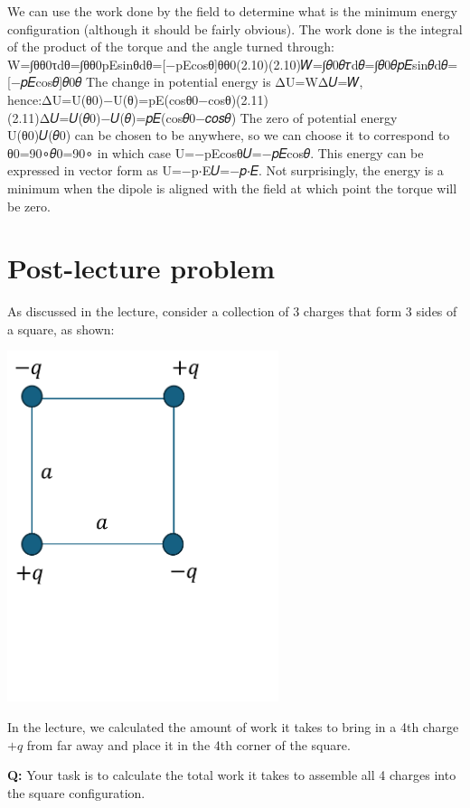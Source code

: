 \documentclass[
  letterpaper,
  DIV=11,
  numbers=noendperiod]{scrreprt}
\begin{document}
We can use the work done by the field to determine what is the minimum
energy configuration (although it should be fairly obvious). The work
done is the integral of the product of the torque and the angle turned
through:
W=∫θθ0\textbar τ\textbar dθ=∫θθ0pEsinθdθ={[}−pEcosθ{]}θθ0(2.10)(2.10)𝑊=∫𝜃0𝜃\textbar 𝜏\textbar d𝜃=∫𝜃0𝜃𝑝𝐸sin⁡𝜃d𝜃={[}−𝑝𝐸cos⁡𝜃{]}𝜃0𝜃
The change in potential energy is ΔU=WΔ𝑈=𝑊,
hence:ΔU=U(θ0)−U(θ)=pE(cosθ0−cosθ)(2.11)(2.11)Δ𝑈=𝑈(𝜃0)−𝑈(𝜃)=𝑝𝐸(cos⁡⁡𝜃0−𝑐𝑜𝑠𝜃)
The zero of potential energy U(θ0)𝑈(𝜃0) can be chosen to be anywhere, so
we can choose it to correspond to θ0=90∘𝜃0=90∘ in which case
U=−pEcosθ𝑈=−𝑝𝐸cos⁡𝜃. This energy can be expressed in vector form as
U=−p⋅E𝑈=−𝑝⋅𝐸. Not surprisingly, the energy is a minimum when the dipole
is aligned with the field at which point the torque will be zero.

\section{Post-lecture problem}\label{post-lecture-problem-2}

As discussed in the lecture, consider a collection of 3 charges that
form 3 sides of a square, as shown:

\includegraphics[width=3.125in,height=\textheight]{Figures/L3_3charges.png}

In the lecture, we calculated the amount of work it takes to bring in a
4th charge \(+q\) from far away and place it in the 4th corner of the
square.

\textbf{Q:} Your task is to calculate the total work it takes to
assemble all 4 charges into the square configuration.
\end{document}
